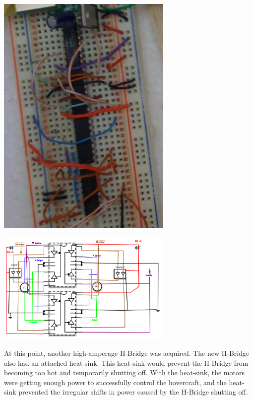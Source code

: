 \begin{minipage}{6.5in}
\begin{center}
  \includegraphics[width=85mm]{imageSources/designProblemsHBridge1.png}
\end{center}
\label{HbridgeWiring}
\end{minipage}

\begin{minipage}{6.5in}
\begin{center}
  \includegraphics[width=85mm]{imageSources/designProblemsHBridge2.png}
\end{center}
\label{HbridgeWiring2}
\end{minipage}

At this point, another high-amperage H-Bridge was acquired. The new H-Bridge also had an attached heat-sink. This heat-sink would prevent the H-Bridge from becoming too hot and temporarily shutting off. With the heat-sink, the motors were getting enough power to successfully control the hovercraft, and the heat-sink prevented the irregular shifts in power caused by the H-Bridge shutting off.


